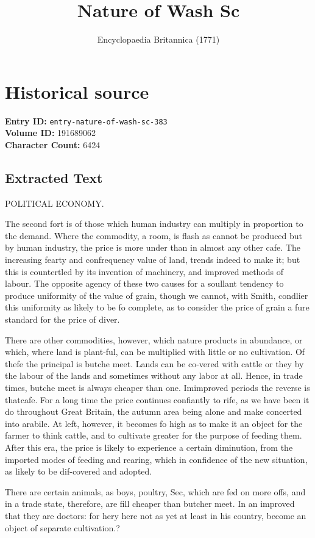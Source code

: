 \documentclass{article}
\title{Nature of Wash Sc}
\date{Encyclopaedia Britannica (1771)}
\begin{document}
\maketitle

\section*{Historical source}
\textbf{Entry ID:} \texttt{entry-nature-of-wash-sc-383} \\
\textbf{Volume ID:} 191689062 \\
\textbf{Character Count:} 6424

\subsection*{Extracted Text}
POLITICAL ECONOMY.

The second fort is of those which human industry can multiply in proportion to the demand. Where the commodity, a room, is flash as cannot be produced but by human industry, the price is more under than in almost any other cafe. The increasing fearty and confrequency value of land, trends indeed to make it; but this is countertled by its invention of machinery, and improved methods of labour. The opposite agency of these two causes for a soullant tendency to produce uniformity of the value of grain, though we cannot, with Smith, condlier this uniformity as likely to be fo complete, as to consider the price of grain a fure standard for the price of diver.

There are other commodities, however, which nature products in abundance, or which, where land is plant-ful, can be multiplied with little or no cultivation. Of thefe the principal is butche meet. Lands can be co-vered with cattle or they by the labour of the lands and sometimes without any labor at all. Hence, in trade times, butche meet is always cheaper than one. Imimproved periods the reverse is thatcafe. For a long time the price continues confiantly to rife, as we have been it do throughout Great Britain, the autumn area being alone and make concerted into arabile. At left, however, it becomes fo high as to make it an object for the farmer to think cattle, and to cultivate greater for the purpose of feeding them. After this era, the price is likely to experience a certain diminution, from the imported modes of feeding and rearing, which in confidence of the new situation, as likely to be dif-covered and adopted.

There are certain animals, as boys, poultry, Sec, which are fed on more offs, and in a trade state, therefore, are fill cheaper than butcher meet. In an improved that they are doctors: for hery here not as yet at least in his country, become an object of separate cultivation.?
\end{document}
